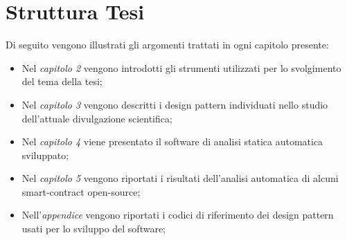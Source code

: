 \section{Struttura Tesi}
Di seguito vengono illustrati gli argomenti trattati in ogni capitolo presente:
\begin{itemize}
	\item Nel \textit{capitolo 2} vengono introdotti gli strumenti utilizzati per lo svolgimento del tema della tesi;
	\item Nel \textit{capitolo 3} vengono descritti i design pattern individuati nello studio dell'attuale divulgazione scientifica;
	\item Nel \textit{capitolo 4} viene presentato il software di analisi statica automatica sviluppato;
	\item Nel \textit{capitolo 5} vengono riportati i risultati dell'analisi automatica di alcuni smart-contract open-source;
	\item Nell'\textit{appendice} vengono riportati i codici di riferimento dei design pattern usati per lo sviluppo del software;
\end{itemize}